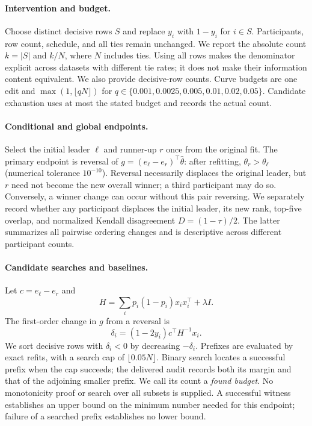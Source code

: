 \paragraph{Intervention and budget.}
Choose distinct decisive rows $S$ and replace $y_i$ with $1-y_i$ for $i\in S$. Participants, row count, schedule, and all ties remain unchanged. We report the absolute count $k=|S|$ and $k/N$, where $N$ includes ties. Using all rows makes the denominator explicit across datasets with different tie rates; it does not make their information content equivalent. We also provide decisive-row counts. Curve budgets are one edit and $\max(1,\lfloor qN\rfloor)$ for $q\in\{0.001,0.0025,0.005,0.01,0.02,0.05\}$. Candidate exhaustion uses at most the stated budget and records the actual count.

\paragraph{Conditional and global endpoints.}
Select the initial leader $\ell$ and runner-up $r$ once from the original fit. The primary endpoint is reversal of $g=(e_\ell-e_r)^\top\hat\theta$: after refitting, $\theta_r>\theta_\ell$ (numerical tolerance $10^{-10}$). Reversal necessarily displaces the original leader, but $r$ need not become the new overall winner; a third participant may do so. Conversely, a winner change can occur without this pair reversing. We separately record whether any participant displaces the initial leader, its new rank, top-five overlap, and normalized Kendall disagreement $D=(1-\tau)/2$. The latter summarizes all pairwise ordering changes and is descriptive across different participant counts.

\paragraph{Candidate searches and baselines.}
Let $c=e_\ell-e_r$ and
\begin{equation}
 H=\sum_i p_i(1-p_i)x_i x_i^\top+\lambda I.
\end{equation}
The first-order change in $g$ from a reversal is
\begin{equation}
 \delta_i=(1-2y_i)c^\top H^{-1}x_i.
 \label{eq:influence}
\end{equation}
We sort decisive rows with $\delta_i<0$ by decreasing $-\delta_i$. Prefixes are evaluated by exact refits, with a search cap of $\lfloor0.05N\rfloor$. Binary search locates a successful prefix when the cap succeeds; the delivered audit records both its margin and that of the adjoining smaller prefix. We call its count a \emph{found budget}. No monotonicity proof or search over all subsets is supplied. A successful witness establishes an upper bound on the minimum number needed for this endpoint; failure of a searched prefix establishes no lower bound.

